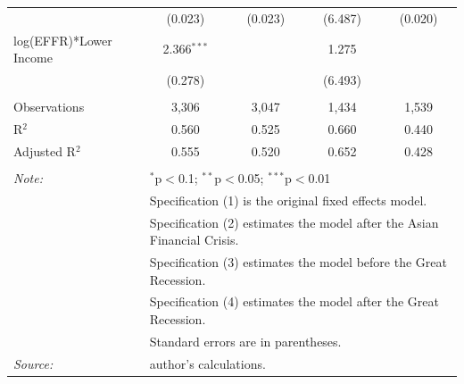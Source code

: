 \documentclass[12pt]{article}
\begin{document}
\begin{table}[h!]
\begin{tabular}{@{\extracolsep{5pt}}lcccc}
  & (0.023) & (0.023) & (6.487) & (0.020) \\ 
  log(EFFR)*Lower Income & 2.366$^{***}$ &  & 1.275 &  \\ 
  & (0.278) &  & (6.493) &  \\ 
 \hline \\[-1.8ex] 
Observations & 3,306 & 3,047 & 1,434 & 1,539 \\ 
R$^{2}$ & 0.560 & 0.525 & 0.660 & 0.440 \\ 
Adjusted R$^{2}$ & 0.555 & 0.520 & 0.652 & 0.428 \\ 
\hline 
\hline \\[-1.8ex] 
\textit{Note:}  & \multicolumn{4}{l}{$^{*}$p$<$0.1; $^{**}$p$<$0.05; $^{***}$p$<$0.01} \\ 
 & \multicolumn{4}{l}{Specification (1) is the original fixed effects model.} \\ 
 & \multicolumn{4}{l}{Specification (2) estimates the model after the Asian Financial Crisis.} \\ 
 & \multicolumn{4}{l}{Specification (3) estimates the model before the Great Recession.} \\ 
 & \multicolumn{4}{l}{Specification (4) estimates the model after the Great Recession.} \\ 
 & \multicolumn{4}{l}{Standard errors are in parentheses.} \\ 
 \textit{Source:}& \multicolumn{4}{l}{author's calculations.} \\ 
\end{tabular} 
\end{table} 
\FloatBarrier
\end{document}
